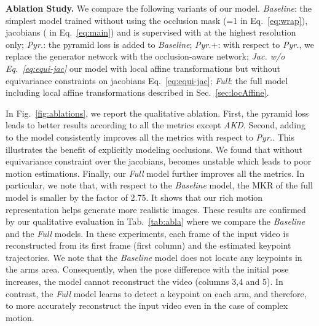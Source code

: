 \documentclass{article}
\begin{document}
 \textbf{Ablation Study.}
We compare the following variants of our model. \emph{Baseline}: the simplest model trained without using the occlusion mask (=1 in Eq.~\eqref{eq:wrap}),  jacobians ( in Eq.~\eqref{eq:main}) and is supervised with  at the highest resolution only; \emph{Pyr.}: the pyramid loss is added to \emph{Baseline}; \emph{Pyr.}+: with respect to \emph{Pyr.}, we replace the generator network with the occlusion-aware network; \emph{Jac. w/o Eq.~\eqref{eq:equi-jac}} our model with local affine transformations but without equivariance constraints on jacobians Eq.~\eqref{eq:equi-jac}; \emph{Full}: the full model including local affine transformations described in Sec.~\ref{sec:locAffine}.
 
In Fig.~\ref{fig:ablations}, we report the qualitative ablation. First, the pyramid loss leads to better results according to all the metrics except \emph{AKD}. Second, adding  to the model consistently improves all the metrics with respect to \emph{Pyr.}. This illustrates the benefit of explicitly modeling occlusions. We found that without equivariance constraint over the jacobians,  becomes unstable which leads to poor motion estimations. Finally, our \emph{Full} model further improves all the metrics. In particular, we note that, with respect to the \emph{Baseline} model, the MKR of the full model is smaller by the factor of 2.75. It shows that our rich motion representation helps generate more realistic images. These results are confirmed by our qualitative evaluation in Tab.~\ref{tab:abla} where we compare the \emph{Baseline} and the \emph{Full} models. In these experiments, each frame  of the input video is reconstructed from its first frame (first column) and the estimated keypoint trajectories. We note that the \emph{Baseline} model does not locate any keypoints in the arms area. Consequently, when the pose difference with the initial pose increases, the model cannot reconstruct the video (columns 3,4 and 5). In contrast, the \emph{Full} model learns to detect a keypoint on each arm, and therefore, to more accurately reconstruct the input video even in the case of complex motion. 
\end{document}

